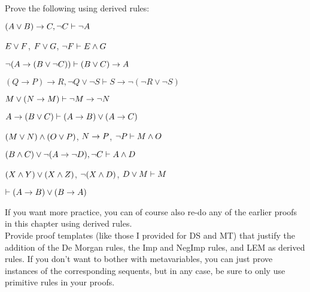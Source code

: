 \problempart
Prove the following using derived rules:
\begin{earg}
\item $(A \vee B) \rightarrow C , \neg C \vdash \neg A$
\item $E\vee F$, $F\vee G$, $\neg F \vdash E \wedge G$
\item $\neg (A \rightarrow (B \vee \neg C)) \vdash (B \vee C) \rightarrow A$
\item $(Q \rightarrow P) \rightarrow R, \lnot Q \lor \lnot S \vdash S \rightarrow \lnot (\lnot R \lor \lnot S)$
\item $M\vee(N\rightarrow M)  \vdash  \neg M \rightarrow \neg N$
\item $A \rightarrow (B \vee C) \vdash (A \rightarrow B) \vee (A \rightarrow C)$
\item $(M \vee N) \wedge (O \vee P)$, $N \rightarrow P$, $\neg P  \vdash  M\wedge O$
\item $(B \wedge C) \vee \neg (A \rightarrow \neg D), \neg C \vdash A \wedge D$
\item $(X\wedge Y)\vee(X\wedge Z)$, $\neg(X\wedge D)$, $D\vee M  \vdash  M$
\item $\vdash (A \rightarrow B) \vee (B \rightarrow A)$

\end{earg}
If you want more practice, you can of course also re-do any of the earlier proofs in this chapter using derived rules. \\

\problempart
Provide proof templates (like those I provided for DS and MT) that justify the addition of the De Morgan rules, the Imp and NegImp rules, and LEM as derived rules. If you don't want to bother with metavariables, you can just prove instances of the corresponding sequents, but  in any case, be sure to only use primitive rules in your proofs.
